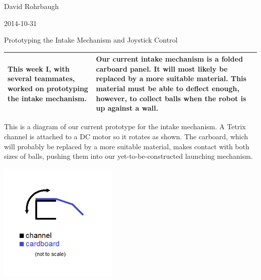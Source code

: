 David Rohrbaugh

2014-10-31

Prototyping the Intake Mechanism and Joystick Control

\begin{tabular}{|p{5cm}|p{5cm}|}
 \hline
 This week I, with several teammates, worked on prototyping the intake mechanism.
 &
 Our current intake mechanism is a folded carboard panel. It will most likely be replaced by a more suitable material. This material must be able to deflect enough, however, to collect balls when the robot is up against a wall.
 \\
 \hline
\end{tabular}

\medskip

This is a diagram of our current prototype for the intake mechanism. A Tetrix channel is attached to a DC motor so it rotates as shown. The carboard, which will probably be replaced by a more suitable material, makes contact with both sizes of balls, pushing them into our yet-to-be-constructed launching mechanism.

\begin{center}
 \includegraphics[width=215px]{./Entries/Images/intakePrototype.png}
\end{center}
